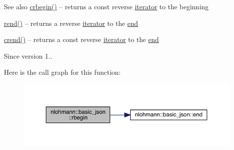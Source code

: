 \begin{DoxySeeAlso}{See also}
\mbox{\hyperlink{classnlohmann_1_1basic__json_a1e0769d22d54573f294da0e5c6abc9de}{crbegin()}} -- returns a const reverse \mbox{\hyperlink{classnlohmann_1_1basic__json_a099316232c76c034030a38faa6e34dca}{iterator}} to the beginning 

\mbox{\hyperlink{classnlohmann_1_1basic__json_ac77aed0925d447744676725ab0b6d535}{rend()}} -- returns a reverse \mbox{\hyperlink{classnlohmann_1_1basic__json_a099316232c76c034030a38faa6e34dca}{iterator}} to the \mbox{\hyperlink{classnlohmann_1_1basic__json_a13e032a02a7fd8a93fdddc2fcbc4763c}{end}} 

\mbox{\hyperlink{classnlohmann_1_1basic__json_a5795b029dbf28e0cb2c7a439ec5d0a88}{crend()}} -- returns a const reverse \mbox{\hyperlink{classnlohmann_1_1basic__json_a099316232c76c034030a38faa6e34dca}{iterator}} to the \mbox{\hyperlink{classnlohmann_1_1basic__json_a13e032a02a7fd8a93fdddc2fcbc4763c}{end}}
\end{DoxySeeAlso}
\begin{DoxySince}{Since}
version 1.. 
\end{DoxySince}
Here is the call graph for this function\+:
\nopagebreak
\begin{figure}[H]
\begin{center}
\leavevmode
\includegraphics[width=350pt]{classnlohmann_1_1basic__json_a1ef93e2006dbe52667294f5ef38b0b10_cgraph}
\end{center}
\end{figure}
\mbox{\label{classnlohmann_1_1basic__json_a515e7618392317dbf4b72d3e18bf2ab2}} 

